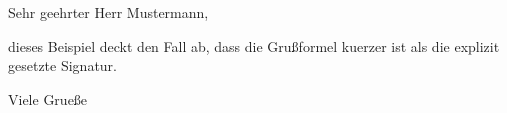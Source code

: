 \documentclass[basic]{../onlinebrief24}
\begin{document}
\begin{letter}{}

\opening{Sehr geehrter Herr Mustermann,}

dieses Beispiel deckt den Fall ab, dass die Gru\ss{}formel kuerzer ist als die
explizit gesetzte Signatur.

\closing{Viele Grue\ss{}e}

\end{letter}
\end{document}
